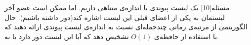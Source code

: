 
‌مسئله[10]
یک لیست پیوندی با اندازه‌ی متناهی داریم. اما ممکن است عضو آخر لیستمان  به یکی از اعضای قبلی
این لیست اشاره کند(دور داشته باشیم). حال الگوریتمی از مرتبه‌ی زمانی چندجمله‌ای نسبت به اندازه‌ی لیست پیوندی ارائه دهید که با استفاده از حافظه‌ی
$O(1)$
تشخیص دهد که آیا این لیست دور دارد یا نه.












